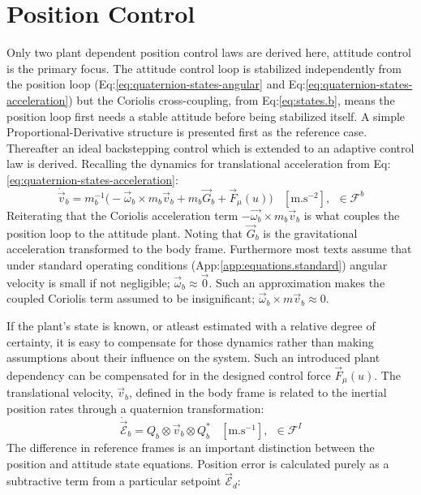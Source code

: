 {\section{Position Control}
\label{sec:control.position}
Only two plant dependent position control laws are derived here, attitude control is the primary focus. The attitude control loop is stabilized independently from the position loop (Eq:\ref{eq:quaternion-states-angular} and Eq:\ref{eq:quaternion-states-acceleration}) but the Coriolis cross-coupling, from Eq:\ref{eq:states.b}, means the position loop first needs a stable attitude before being stabilized itself. A simple Proportional-Derivative structure is presented first as the reference case. Thereafter an ideal backstepping control which is extended to an adaptive control law is derived. Recalling the dynamics for translational acceleration from Eq:\ref{eq:quaternion-states-acceleration}:
\begin{equation}\label{eq:position-deriv}
\dot{\vec{v}}_b=m_b^{-1}\big(-\vec{\omega}_b\times m_b\vec{v}_b+m_b\vec{G}_b+\vec{F}_\mu(u)\big)~~~~[\text{m.s}^{-2}],~~\in\mathcal{F}^b
\end{equation}
Reiterating that the Coriolis acceleration term $-\vec{\omega_b}\times m_b\vec{v}_b$ is what couples the position loop to the attitude plant. Noting that $\vec{G}_b$ is the gravitational acceleration transformed to the body frame. Furthermore most texts assume that under standard operating conditions (App:\ref{app:equations.standard}) angular velocity is small if not negligible; $\vec{\omega}_b\approx\vec{0}$. Such an approximation makes the coupled Coriolis term assumed to be insignificant; $\vec{\omega}_b\times m\vec{v}_b\approx 0$. 
\par
If the plant's state is known, or atleast estimated with a relative degree of certainty, it is easy to compensate for those dynamics rather than making assumptions about their influence on the system. Such an introduced plant dependency can be compensated for in the designed control force $\vec{F}_\mu(u)$. The translational velocity, $\vec{v}_b$, defined in the body frame is related to the inertial position rates through a quaternion transformation:
\begin{equation}
\dot{\vec{\mathcal{E}}}_b=Q_b\otimes\vec{v}_b\otimes Q_b^*~~~~[\text{m.s}^{-1}],~~\in\mathcal{F}^I
\end{equation}
The difference in reference frames is an important distinction between the position and attitude state equations. Position error is calculated purely as a subtractive term from a particular setpoint $\vec{\mathcal{E}}_d$:
}
